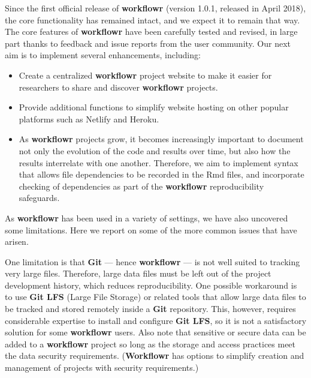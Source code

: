 \documentclass[9pt,a4paper]{extarticle}
\begin{document}
Since the first official release of \textbf{workflowr} (version 1.0.1, released
in April 2018), the core functionality has remained intact, and we
expect it to remain that way. The core features of \textbf{workflowr} have been
carefully tested and revised, in large part thanks to feedback and issue
reports from the user community. Our next aim is to implement several
enhancements, including:

\begin{itemize}

\item Create a centralized \textbf{workflowr} project website to make it easier
for researchers to share and discover \textbf{workflowr} projects.

\item Provide additional functions to simplify website hosting on other
popular platforms such as Netlify and Heroku.

\item As \textbf{workflowr} projects grow, it becomes increasingly important to
document not only the evolution of the code and results over time, but
also how the results interrelate with one another. Therefore, we aim to
implement syntax that allows file dependencies to be recorded in the Rmd
files, and incorporate checking of dependencies as part of the \textbf{workflowr}
reproducibility safeguards.

\end{itemize}

As \textbf{workflowr} has been used in a variety of settings, we have also
uncovered some limitations. Here we report on some of the more common
issues that have arisen.

One limitation is that \textbf{Git} --- hence \textbf{workflowr} --- is not well suited to
tracking very large files. Therefore, large data files must be left out
of the project development history, which reduces reproducibility. One
possible workaround is to use \textbf{Git LFS} (Large File Storage) or related
tools that allow large data files to be tracked and stored remotely
inside a \textbf{Git} repository. This, however, requires considerable expertise
to install and configure \textbf{Git LFS}, so it is not a satisfactory solution
for some \textbf{workflowr} users. Also note that sensitive or secure data can be
added to a \textbf{workflowr} project so long as the storage and access practices
meet the data security requirements.  (\textbf{Workflowr} has options to simplify
creation and management of projects with security requirements.)
\end{document}
